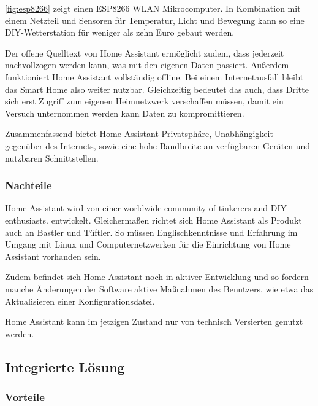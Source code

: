 \autoref{fig:esp8266} zeigt einen ESP8266 WLAN Mikrocomputer.
In Kombination mit einem Netzteil und Sensoren für Temperatur, Licht und Bewegung kann so eine \ac{DIY}-Wetterstation für weniger als zehn Euro gebaut werden.

Der offene Quelltext von Home Assistant ermöglicht zudem, dass jederzeit nachvollzogen werden kann, was mit den eigenen Daten passiert.
Außerdem funktioniert Home Assistant vollständig offline.
Bei einem Internetausfall bleibt das Smart Home also weiter nutzbar.
Gleichzeitig bedeutet das auch, dass Dritte sich erst Zugriff zum eigenen Heimnetzwerk verschaffen müssen, damit ein Versuch unternommen werden kann Daten zu kompromittieren.

Zusammenfassend bietet Home Assistant Privatsphäre, Unabhängigkeit gegenüber des Internets, sowie eine hohe Bandbreite an verfügbaren Geräten und nutzbaren Schnittstellen.

\subsubsection{Nachteile}

Home Assistant wird von einer \glqq worldwide community of tinkerers and DIY enthusiasts.\grqq{} entwickelt.
Gleichermaßen richtet sich Home Assistant als Produkt auch an Bastler und Tüftler.
So müssen Englischkenntnisse und Erfahrung im Umgang mit Linux und Computernetzwerken für die Einrichtung von Home Assistant vorhanden sein.

Zudem befindet sich Home Assistant noch in aktiver Entwicklung und so fordern manche Änderungen der Software aktive Maßnahmen des Benutzers, wie etwa das Aktualisieren einer Konfigurationsdatei.

Home Assistant kann im jetzigen Zustand nur von technisch Versierten genutzt werden.

\subsection{Integrierte Lösung} %


\subsubsection{Vorteile}

